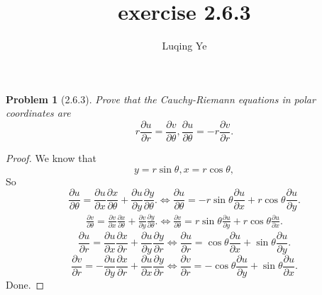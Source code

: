 \documentclass{amsart}
\newcommand\pa{{\partial}}
\theoremstyle{plain}
\newtheorem{problem}[theorem]{Problem}
\theoremstyle{definition}
\begin{document}
\title{exercise 2.6.3}

\author{Luqing Ye} \address{College of Science, Hangzhou Normal
  University,Hangzhou City,Zhejiang Province,China}

\maketitle
\setcounter{tocdepth}{2}

\begin{problem}[2.6.3]
  Prove that the Cauchy-Riemann equations in polar coordinates are
$$
r \frac{\partial u}{\partial r}=\frac{\partial v}{\partial
  \theta},\frac{\partial u}{\partial \theta}=-r \frac{\partial
  v}{\partial r}.
$$
\end{problem}
\begin{proof}
We know that 
$$
y=r\sin\theta,x=r\cos\theta,
$$
So
$$
\frac{\partial u}{\partial \theta}=\frac{\partial u}{\partial
  x}\frac{\partial x}{\partial \theta}+\frac{\partial u}{\partial
  y}\frac{\partial y}{\partial\theta}.\iff \frac{\partial u}{\partial
  \theta}=-r\sin\theta\frac{\partial u}{\partial
  x}+r\cos\theta\frac{\partial u}{\partial y}.
$$
\begin{align*}
  \frac{\partial v}{\partial\theta}=\frac{\partial v}{\partial
    x}\frac{\partial x}{\partial\theta}+\frac{\partial v}{\partial
    y}\frac{\partial y}{\partial \theta}.\iff \frac{\partial
    v}{\partial\theta}=r\sin\theta\frac{\partial u}{\partial
    y}+r\cos\theta\frac{\partial u}{\partial x}.
\end{align*}
$$
\frac{\partial u}{\partial r}=\frac{\pa u}{\pa x}\frac{\pa x}{\pa
  r}+\frac{\pa u}{\pa y}\frac{\pa y}{\pa r}\iff \frac{\pa u}{\pa
  r}=\cos\theta\frac{\pa u}{\pa x}+\sin\theta\frac{\pa u}{\pa y}.
$$
$$
\frac{\pa v}{\pa r}=-\frac{\pa u}{\pa y}\frac{\pa x}{\pa r}+\frac{\pa
  u}{\pa x}\frac{\pa y}{\pa r}\iff \frac{\pa v}{\pa r}=-\cos\theta\frac{\pa
  u}{\pa y}+\sin\theta\frac{\pa u}{\pa x}.
$$
Done.
\end{proof}
\end{document}

